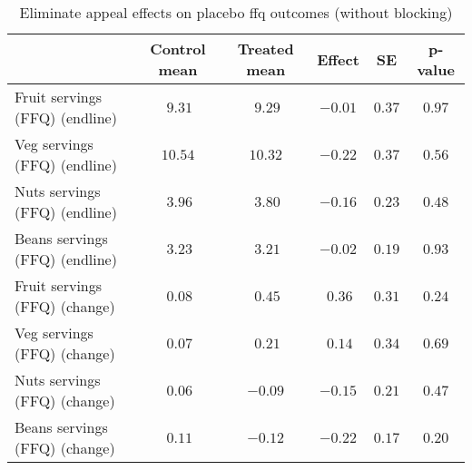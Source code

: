 \begin{table*}[ht]
\caption{Eliminate appeal effects on placebo ffq outcomes (without blocking)\label{round}} 
\begin{center}
\begin{tabular}{lccccc}
\hline\hline
\multicolumn{1}{l}{}&\multicolumn{1}{c}{Control mean}&\multicolumn{1}{c}{Treated mean}&\multicolumn{1}{c}{Effect}&\multicolumn{1}{c}{SE}&\multicolumn{1}{c}{p-value}\tabularnewline
\hline
Fruit servings (FFQ) (endline)&$~9.31$&$~9.29$&$-0.01$&$0.37$&$0.97$\tabularnewline
Veg servings (FFQ) (endline)&$10.54$&$10.32$&$-0.22$&$0.37$&$0.56$\tabularnewline
Nuts servings (FFQ) (endline)&$~3.96$&$~3.80$&$-0.16$&$0.23$&$0.48$\tabularnewline
Beans servings (FFQ) (endline)&$~3.23$&$~3.21$&$-0.02$&$0.19$&$0.93$\tabularnewline
Fruit servings (FFQ) (change)&$~0.08$&$~0.45$&$~0.36$&$0.31$&$0.24$\tabularnewline
Veg servings (FFQ) (change)&$~0.07$&$~0.21$&$~0.14$&$0.34$&$0.69$\tabularnewline
Nuts servings (FFQ) (change)&$~0.06$&$-0.09$&$-0.15$&$0.21$&$0.47$\tabularnewline
Beans servings (FFQ) (change)&$~0.11$&$-0.12$&$-0.22$&$0.17$&$0.20$\tabularnewline
\hline
\end{tabular}\end{center}

\end{table*}
